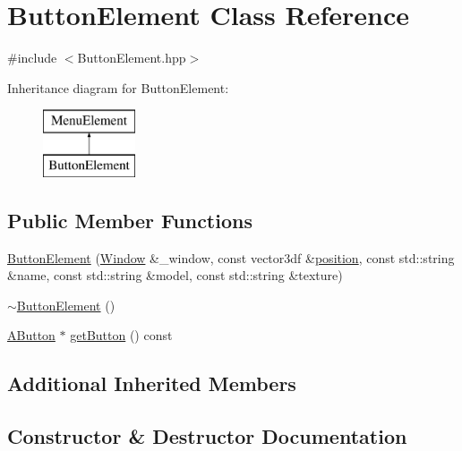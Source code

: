 \hypertarget{class_button_element}{}\section{Button\+Element Class Reference}
\label{class_button_element}


{\ttfamily \#include $<$Button\+Element.\+hpp$>$}

Inheritance diagram for Button\+Element\+:\begin{figure}[H]
\begin{center}
\leavevmode
\includegraphics[height=2.000000cm]{class_button_element}
\end{center}
\end{figure}
\subsection*{Public Member Functions}
\begin{DoxyCompactItemize}
\item 
\mbox{\hyperlink{class_button_element_a114aac893d371562ebc6b2e1bdbf4974}{Button\+Element}} (\mbox{\hyperlink{class_window}{Window}} \&\+\_\+window, const vector3df \&\mbox{\hyperlink{class_menu_element_a7f59490282ff54f6c82ee478c8ea6cc1}{position}}, const std\+::string \&name, const std\+::string \&model, const std\+::string \&texture)
\item 
\mbox{\hyperlink{class_button_element_ac2cffdd95b10d224d5a9f37c121fe93d}{$\sim$\+Button\+Element}} ()
\item 
\mbox{\hyperlink{class_a_button}{A\+Button}} $\ast$ \mbox{\hyperlink{class_button_element_a3729f951afa3d2a970e7517ac2ed5e43}{get\+Button}} () const
\end{DoxyCompactItemize}
\subsection*{Additional Inherited Members}


\subsection{Constructor \& Destructor Documentation}
\mbox{\label{class_button_element_a114aac893d371562ebc6b2e1bdbf4974}} 
